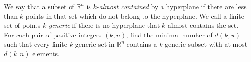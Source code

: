 We say that a subset of \(\mathbb{R}^n\) is \(k\)-\textit{almost contained} by a hyperplane if there are less than \(k\) points in that set which do not belong to the hyperplane. We call a finite set of points \(k\)-\textit{generic} if there is no hyperplane that \(k\)-almost contains the set. For each pair of positive integers \((k, n)\), find the minimal number of \(d(k, n)\) such that every finite \(k\)-generic set in \(\mathbb{R}^n\) contains a \(k\)-generic subset with at most \(d(k, n)\) elements.